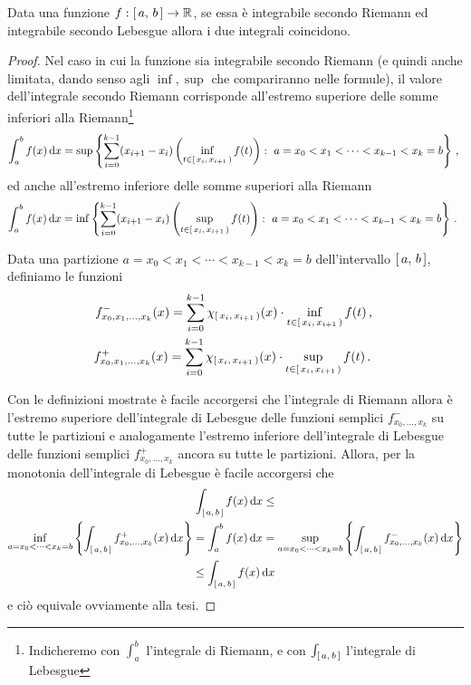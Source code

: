 \begin{proposition}\label{prop:IntegraleRiemannCoincide}
	Data una funzione $f:\left[\,a,\,b\,\right]\to \mathbb R$, se essa è integrabile secondo Riemann ed integrabile secondo Lebesgue allora i due integrali coincidono.
\end{proposition}
\begin{proof}
	Nel caso in cui la funzione sia integrabile secondo Riemann (e quindi anche limitata, dando senso agli $\inf,\sup$ che compariranno nelle formule), il valore dell'integrale secondo Riemann corrisponde all'estremo superiore delle somme inferiori alla Riemann\footnote{Indicheremo con $\int_a^b$ l'integrale di Riemann, e con $\int_{\left[\,a,\,b\,\right]}$ l'integrale di Lebesgue}
	\begin{equation*}
		\int_a^b f(x)\de x=\sup\left\{\sum_{i=0}^{k-1} (x_{i+1}-x_i)\left(\inf_{t\in\co{x_i}{x_{i+1}}}f(t)\right):\ a=x_0<x_1<\cdots<x_{k-1}<x_k=b\right\} \virgola
	\end{equation*}
	ed anche all'estremo inferiore delle somme superiori alla Riemann
	\begin{equation*}
		\int_a^b f(x)\de x=\inf\left\{\sum_{i=0}^{k-1} (x_{i+1}-x_i)\left(\sup_{t\in\co{x_i}{x_{i+1}}}f(t)\right):\ a=x_0<x_1<\cdots<x_{k-1}<x_k=b\right\} \punto
	\end{equation*}
	
	Data una partizione $a=x_0<x_1<\cdots<x_{k-1}<x_k=b$ dell'intervallo $\left[\,a,\,b\,\right]$, definiamo le funzioni
	\begin{align*}
		f^-_{x_0,x_1,\dots,x_k}(x)=\sum_{i=0}^{k-1}\chi_{\left[\,x_i,\,x_{i+1}\,\right)}(x)\cdot\inf_{t\in\left[\,x_i,\,x_{i+1}\,\right)}f(t) \, \text{, } \\
		f^+_{x_0,x_1,\dots,x_k}(x)=\sum_{i=0}^{k-1}\chi_{\left[\,x_i,\,x_{i+1}\,\right)}(x)\cdot\sup_{t\in\left[\,x_i,\,x_{i+1}\,\right)}f(t) \, \text{. }
	\end{align*}

	Con le definizioni mostrate è facile accorgersi che l'integrale di Riemann allora è l'estremo superiore dell'integrale di Lebesgue delle funzioni semplici $f^-_{x_0,\dots,x_k}$ su tutte le partizioni e analogamente l'estremo inferiore dell'integrale di Lebesgue delle funzioni semplici $f^+_{x_0,\dots,x_k}$ ancora su tutte le partizioni.
	Allora, per la monotonia dell'integrale di Lebesgue è facile accorgersi che
	\begin{multline*}
		\int_{\left[\,a,\,b\,\right]}f(x)\,\mathrm d x\le \\
		\inf_{a=x_0<\dots<x_k=b}\left\{\int_{\left[\,a,\,b\,\right]}f^+_{x_0,\dots,x_k}(x)\,\mathrm d x\right\}
		=\int_a^b f(x)\,\mathrm d x= 
		\sup_{a=x_0<\dots<x_k=b}\left\{\int_{\left[\,a,\,b\,\right]}f^-_{x_0,\dots,x_k}(x)\,\mathrm d x\right\}\\
		 \le \int_{\left[\,a,\,b\,\right]} f(x)\,\mathrm d x
	\end{multline*}
	e ciò equivale ovviamente alla tesi.
\end{proof}

